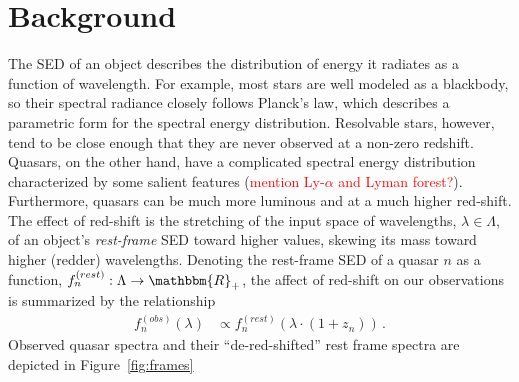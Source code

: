 \documentclass{article}
\newcommand{\R}{\mathbbm{R}}
\newcommand{\red}[1]{\textcolor{red}{#1}}
\begin{document}
\section{Background}
The SED of an object describes the distribution of energy it radiates as a function of wavelength.  
For example, most stars are well modeled as a blackbody, so their spectral radiance closely follows Planck's law, which describes a parametric form for the spectral energy distribution.  Resolvable stars, however, tend to be close enough that they are never observed at a non-zero redshift. 
Quasars, on the other hand, have a complicated spectral energy distribution characterized by some salient features (\red{mention Ly-$\alpha$ and Lyman forest?}).  
Furthermore, quasars can be much more luminous and at a much higher red-shift.  
The effect of red-shift is the stretching of the input space of wavelengths, $\lambda\in \Lambda$, of an object's \emph{rest-frame} SED toward higher values, skewing its mass toward higher (redder) wavelengths. 
Denoting the rest-frame SED of a quasar $n$ as a function, $f_n^{(rest)} : \Lambda \rightarrow \R_+$, the affect of red-shift on our observations is summarized by the relationship 
\begin{align}
  f_n^{(obs)}(\lambda) &\propto f_n^{(rest)}(\lambda \cdot (1 + z_n)) \, .
\end{align}
Observed quasar spectra and their ``de-red-shifted'' rest frame spectra are depicted in Figure~\ref{fig:frames}
\end{document}
